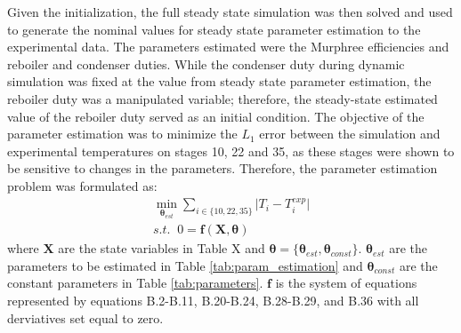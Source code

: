 Given the initialization, the full steady state simulation was then solved and used to generate the nominal values for steady state parameter estimation to the experimental data. The parameters estimated were the Murphree efficiencies and reboiler and condenser duties. While the condenser duty during dynamic simulation was fixed at the value from steady state parameter estimation, the reboiler duty was a manipulated variable; therefore, the steady-state estimated value of the reboiler duty served as an initial condition. The objective of the parameter estimation was to minimize the $L_1$ error between the simulation and experimental temperatures on stages 10, 22 and 35, as these stages were shown to be sensitive to changes in the parameters. Therefore, the parameter estimation problem was formulated as:
\begin{subequations}
    \begin{align}
        \min_{\boldsymbol \theta_{est}} \sum_{i\in \{10, 22, 35\}} \mathopen|T_i-T_i^{exp}\mathclose|\\
        s.t. \;\; 0 = \mathbf f(\mathbf X, \boldsymbol \theta)
    \end{align}
\end{subequations}
where $\mathbf X$ are the state variables in Table X  and $\boldsymbol \theta = \{\boldsymbol \theta_{est}, \boldsymbol \theta_{const} \}$.  $\boldsymbol \theta_{est}$ are the parameters to be estimated in Table \ref{tab:param_estimation} and $\boldsymbol \theta_{const}$ are the constant parameters in Table \ref{tab:parameters}. $\mathbf f$ is the system of equations represented by equations B.2-B.11, B.20-B.24, B.28-B.29, and B.36 with all derviatives set equal to zero. 

